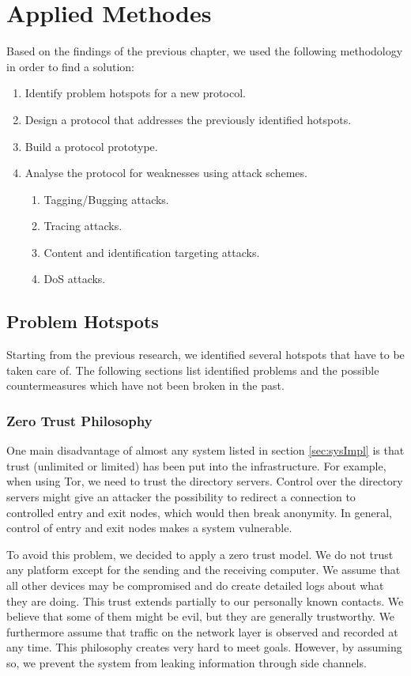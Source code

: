 \chapter{Applied Methodes\label{sec:appliedMethods}}
Based on the findings of the previous chapter, we used the following methodology in order to find a solution:
\begin{enumerate}
	\item Identify problem hotspots for a new protocol.
	\item Design a protocol that addresses the previously identified hotspots.
	\item Build a protocol prototype.
	\item Analyse the protocol for weaknesses using attack schemes.
	\begin{enumerate}
		\item Tagging/Bugging attacks.
		\item Tracing attacks.
		\item Content and identification targeting attacks.
		\item DoS attacks.
	\end{enumerate}
\end{enumerate}

\section{Problem Hotspots}
Starting from the previous research, we identified several hotspots that have to be taken care of. The following sections list identified problems and the possible countermeasures which have not been broken in the past.

\subsection{Zero Trust Philosophy}
One main disadvantage of almost any system listed in section \ref{sec:sysImpl} is that trust (unlimited or limited) has been put into the infrastructure. For example, when using Tor, we need to trust the directory servers. Control over the directory servers might give an attacker the possibility to redirect a connection to controlled entry and exit nodes, which would then break anonymity. In general, control of entry and exit nodes makes a system vulnerable. 

To avoid this problem, we decided to apply a zero trust model. We do not trust any platform except for the sending and the receiving computer. We assume that all other devices may be compromised and do create detailed logs about what they are doing. This trust extends partially to our personally known contacts. We believe that some of them might be evil, but they are generally trustworthy. We furthermore assume that traffic on the network layer is observed and recorded at any time. This philosophy creates very hard to meet goals. However, by assuming so, we prevent the system from leaking information through side channels.

